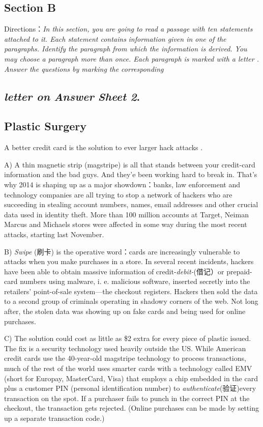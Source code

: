 \documentclass[UTF8,11pt]{ctexart}
\begin{document}
\subsection*{\textbf{Section B}}


Directions：\textit{In this section, you are going to read a passage with ten statements attached to it. Each statement contains} \textit{information given in one of the paragraphs. Identify the paragraph from which the information is derived. You may choose} \textit{a paragraph more than once. Each paragraph is marked with a letter . Answer the questions by marking the corresponding}


\subsection*{\textit{letter on}\textbf{\textit{ Answer}} \textbf{\textit{Sheet}} \textbf{\textit{2}}.}


\subsection*{\textbf{Plastic Surgery}}


A better credit card is the solution to ever larger hack attacks .


A) A thin magnetic strip (magstripe) is all that stands between your credit-card information and the bad guys. And they’e been working hard to break in. That’s why 2014 is shaping up as a major showdown：banks, law enforcement and technology companies are all trying to stop a network of hackers who are succeeding in stealing account numbers, names, email addresses and other crucial data used in identity theft. More than 100 million accounts at Target, Neiman Marcus and Michaels stores were affected in some way during the most recent attacks, starting last November.


B) \textit{Swipe} (刷卡) is the operative word：cards are increasingly vulnerable to attacks when you make purchases in a store. In several recent incidents, hackers have been able to obtain massive information of credit-\textit{debit-}(借记）or prepaid-card numbers using malware, i. e. malicious software, inserted secretly into the retailers’ point-of-sale system—the checkout registers. Hackers then sold the data to a second group of criminals operating in shadowy corners of the web. Not long after, the stolen data was showing up on fake cards and being used for online purchases.


C) The solution could cost as little as \$2 extra for every piece of plastic issued. The fix is a security technology used heavily outside the US. While American credit cards use the 40-year-old magstripe technology to process transactions, much of the rest of the world uses smarter cards with a technology called EMV (short for Europay, MasterCard, Visa) that employs a chip embedded in the card plus a customer PIN (personal identification number) to\textit{ authenticate}(验证)every transaction on the spot. If a purchaser fails to punch in the correct PIN at the checkout, the transaction gets rejected. (Online purchases can be made by setting up a separate transaction code.)
\end{document}
